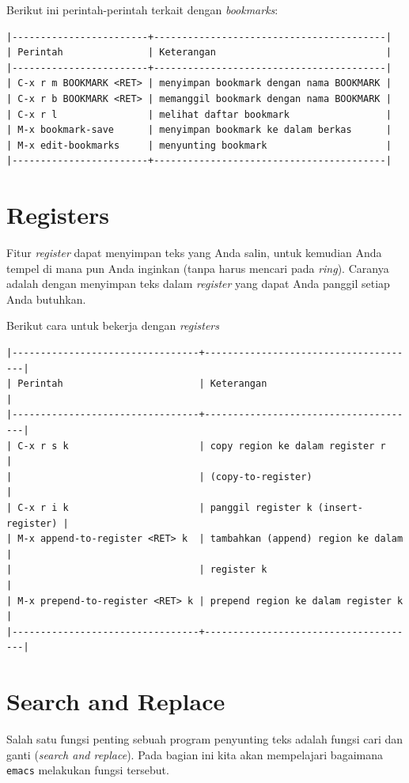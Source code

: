 \documentclass{article}
\begin{document}
Berikut ini perintah-perintah terkait dengan \emph{bookmarks}:

\begin{verbatim}
|------------------------+-----------------------------------------|
| Perintah               | Keterangan                              |
|------------------------+-----------------------------------------|
| C-x r m BOOKMARK <RET> | menyimpan bookmark dengan nama BOOKMARK |
| C-x r b BOOKMARK <RET> | memanggil bookmark dengan nama BOOKMARK |
| C-x r l                | melihat daftar bookmark                 |
| M-x bookmark-save      | menyimpan bookmark ke dalam berkas      |
| M-x edit-bookmarks     | menyunting bookmark                     |
|------------------------+-----------------------------------------|
\end{verbatim}

\section{Registers}
Fitur \emph{register} dapat menyimpan teks yang Anda salin, untuk kemudian 
Anda tempel di mana pun Anda inginkan (tanpa harus mencari pada \emph{ring}).
Caranya adalah dengan menyimpan teks dalam \emph{register} yang dapat Anda
panggil setiap Anda butuhkan. 

Berikut cara untuk bekerja dengan \emph{registers}

\begin{verbatim}
|---------------------------------+--------------------------------------|
| Perintah                        | Keterangan                           |
|---------------------------------+--------------------------------------|
| C-x r s k                       | copy region ke dalam register r      |
|                                 | (copy-to-register)                   |
| C-x r i k                       | panggil register k (insert-register) |
| M-x append-to-register <RET> k  | tambahkan (append) region ke dalam   |
|                                 | register k                           |
| M-x prepend-to-register <RET> k | prepend region ke dalam register k   |
|---------------------------------+--------------------------------------|
\end{verbatim}

\section{Search and Replace}
Salah satu fungsi penting sebuah program penyunting teks adalah fungsi cari
dan ganti (\emph{search and replace}). Pada bagian ini kita akan mempelajari
bagaimana \verb=emacs= melakukan fungsi tersebut.
\end{document}

